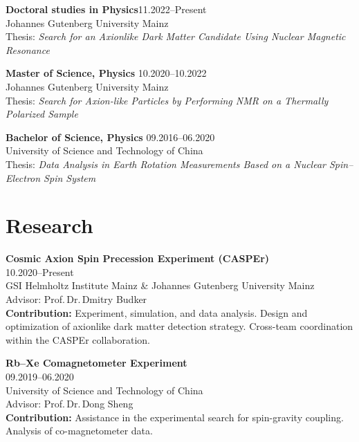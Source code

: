 \textbf{Doctoral studies in Physics}\hfill 11.2022--Present \\
Johannes Gutenberg University Mainz \\
Thesis: \emph{Search for an Axionlike Dark Matter Candidate Using Nuclear Magnetic Resonance}

\vspace{0.5em}

\noindent\textbf{Master of Science, Physics} \hfill 10.2020--10.2022 \\
Johannes Gutenberg University Mainz\\
Thesis: \emph{Search for Axion-like Particles by Performing NMR on a Thermally Polarized Sample}

\vspace{0.5em}

\noindent\textbf{Bachelor of Science, Physics} \hfill 09.2016--06.2020 \\
University of Science and Technology of China\\
Thesis: \emph{Data Analysis in Earth Rotation Measurements Based on a Nuclear Spin--Electron Spin System}


\section*{Research}
\noindent\textbf{Cosmic Axion Spin Precession Experiment (CASPEr)}\\
10.2020--Present \\
GSI Helmholtz Institute Mainz \& Johannes Gutenberg University Mainz \\
Advisor: Prof.\,Dr.\,Dmitry Budker\\
\textbf{Contribution:} Experiment, simulation, and data analysis. Design and optimization of axionlike dark matter detection strategy. Cross-team coordination within the CASPEr collaboration. 

\vspace{0.5em}

\noindent\textbf{Rb--Xe Comagnetometer Experiment}\\
09.2019--06.2020 \\
University of Science and Technology of China \\
Advisor: Prof.\,Dr.\,Dong Sheng\\
\textbf{Contribution:} Assistance in the experimental search for spin-gravity coupling. Analysis of co-magnetometer data. 

\vspace{0.5em}

